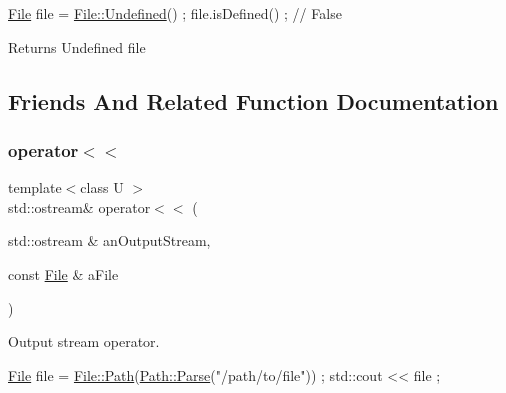 \begin{DoxyCode}
\hyperlink{classlibrary_1_1core_1_1fs_1_1_file_a7490060f19a21d4ee58bb6cec87a1ca6}{File} file = \hyperlink{classlibrary_1_1core_1_1fs_1_1_file_a985adb1a33b94dcdbed2792651eb81af}{File::Undefined}() ;
file.isDefined() ; \textcolor{comment}{// False}
\end{DoxyCode}


\begin{DoxyReturn}{Returns}
Undefined file 
\end{DoxyReturn}


\subsection{Friends And Related Function Documentation}
\mbox{\label{classlibrary_1_1core_1_1fs_1_1_file_aedbcccb29459f2d30d54a53b6850fbd2}} 
\subsubsection{\texorpdfstring{operator$<$$<$}{operator<<}}
{\footnotesize\ttfamily template$<$class U $>$ \\
std\+::ostream\& operator$<$$<$ (\begin{DoxyParamCaption}\item[{std\+::ostream \&}]{an\+Output\+Stream,  }\item[{const \hyperlink{classlibrary_1_1core_1_1fs_1_1_file}{File} \&}]{a\+File }\end{DoxyParamCaption})\hspace{0.3cm}{\ttfamily [friend]}}



Output stream operator. 


\begin{DoxyCode}
\hyperlink{classlibrary_1_1core_1_1fs_1_1_file_a7490060f19a21d4ee58bb6cec87a1ca6}{File} file = \hyperlink{classlibrary_1_1core_1_1fs_1_1_file_a0e0d8a8becb3cdd21775554e181452d8}{File::Path}(\hyperlink{classlibrary_1_1core_1_1fs_1_1_path_aebf5bd3af83e0b7376616e146f3e55df}{Path::Parse}(\textcolor{stringliteral}{"/path/to/file"})) ;
std::cout << file ;
\end{DoxyCode}



